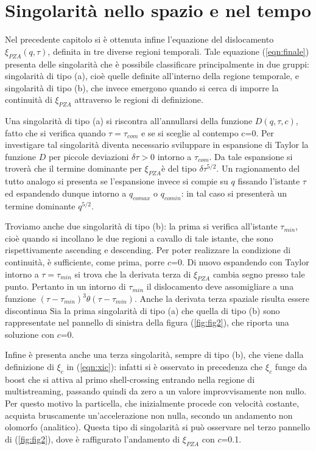 \section{Singolarità nello spazio e nel tempo}
\label{sec:sing}

Nel precedente capitolo si è ottenuta infine l'equazione del dislocamento $\xi_{PZA}(q,\tau)$, definita in tre
diverse regioni temporali. Tale equazione (\ref{eqn:finale}) presenta delle singolarità che è possibile classificare
principalmente in due gruppi: singolarità di tipo (a), cioè quelle definite all'interno della regione temporale, e 
singolarità di tipo (b), che invece emergono quando si cerca di imporre la continuità di $\xi_{PZA}$ attraverso
le regioni di definizione. 

Una singolarità di tipo (a) si riscontra all'annullarsi della funzione $D(q, \tau, c)$, fatto che si verifica quando 
$\tau = \tau_{com}$ e se si sceglie al contempo c=0. Per investigare tal singolarità diventa necessario sviluppare
in espansione di Taylor la funzione $D$ per piccole deviazioni $\delta\tau>0$ intorno a $\tau_{com}$. Da tale espansione
si troverà che il termine dominante per $\xi_{PZA}$è del tipo $\delta\tau^{5/2}$. Un ragionamento del tutto analogo si presenta 
se l'espansione invece si compie su $q$ fissando l'istante $\tau$ ed espandendo dunque intorno a $q_{comax}$ o $q_{comin}$:
in tal caso si presenterà un termine dominante $q^{5/2}$. 

Troviamo anche due singolarità di tipo (b): la prima si verifica all'istante $\tau_{min}$, cioè quando si incollano 
le due regioni a cavallo di tale istante, che sono rispettivamente ascending e descending. Per poter realizzare la 
condizione di continuità, è sufficiente, come prima, porre $c$=0. Di nuovo espandendo con Taylor intorno a  $\tau = 
\tau_{min}$ si trova che la derivata terza di $\xi_{PZA}$ cambia segno presso tale punto. Pertanto in un intorno 
di $\tau_{min}$ il dislocamento deve assomigliare a una funzione $(\tau-\tau_{min})^3 \theta(\tau-\tau_{min})$.
Anche la derivata terza spaziale risulta essere discontinua
Sia la prima singolarità di tipo (a) che quella di tipo (b) sono rappresentate nel pannello di sinistra della figura
(\ref{fig:fig2}), che riporta una soluzione con $c$=0.

Infine è presenta anche una terza singolarità, sempre di tipo (b), che viene dalla definizione di $\xi_c$ in (\ref{eqn:xic}):
infatti si è osservato in precedenza che $\xi_c$ funge da boost che si attiva al primo shell-crossing entrando nella 
regione di multistreaming, passando quindi da zero a un valore improvvisamente non nullo. Per questo motivo la particella,
che inizialmente procede con velocità costante, acquista bruscamente un'accelerazione non nulla, secondo un andamento
non olomorfo (analitico). Questa tipo di singolarità si può osservare nel terzo pannello di (\ref{fig:fig2}), dove è
raffigurato l'andamento di $\xi_{PZA}$ con $c$=0.1.

